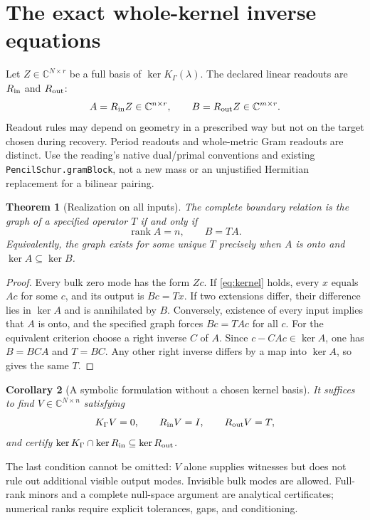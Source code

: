 \documentclass[11pt]{article}
\newtheorem{theorem}{Theorem}[section]
\newtheorem{corollary}[theorem]{Corollary}
\theoremstyle{definition}
\newcommand{\C}{\mathbb C}
\newcommand{\rank}{\operatorname{rank}}
\begin{document}
\section{The exact whole-kernel inverse equations}\label{sec:kernel}
Let $Z\in\C^{N\times r}$ be a full basis of $\ker K_\Gamma(\lambda)$.
The declared linear readouts are $R_{\rm in}$ and $R_{\rm out}$:
\[
 A=R_{\rm in}Z\in\C^{n\times r},\qquad
 B=R_{\rm out}Z\in\C^{m\times r}.
\]
Readout rules may depend on geometry in a prescribed way but not on the
target chosen during recovery. Period readouts and whole-metric Gram
readouts are distinct. Use the reading's native dual/primal conventions
and existing \texttt{PencilSchur.gramBlock}, not a new mass or an
unjustified Hermitian replacement for a bilinear pairing.

\begin{theorem}[Realization on all inputs]\label{thm:kernel}
The complete boundary relation is the graph of a specified operator $T$
if and only if
\begin{equation}\label{eq:kernel}
 \rank A=n,\qquad B=TA.
\end{equation}
Equivalently, the graph exists for some unique $T$ precisely when
$A$ is onto and $\ker A\subseteq\ker B$.
\end{theorem}
\begin{proof}
Every bulk zero mode has the form $Zc$. If \eqref{eq:kernel} holds,
every $x$ equals $Ac$ for some $c$, and its output is $Bc=Tx$.
If two extensions differ, their difference lies in $\ker A$ and is
annihilated by $B$. Conversely, existence of every input implies that
$A$ is onto, and the specified graph forces $Bc=TAc$ for all $c$.
For the equivalent criterion choose a right inverse $C$ of $A$.
Since $c-CAc\in\ker A$, one has $B=BCA$ and $T=BC$.
Any other right inverse differs by a map into $\ker A$, so gives
the same $T$.
\end{proof}

\begin{corollary}[A symbolic formulation without a chosen kernel basis]
It suffices to find $V\in\C^{N\times n}$ satisfying
\[
 K_\Gamma V=0,\qquad R_{\rm in}V=I,\qquad R_{\rm out}V=T,
\]
\emph{and} certify
$\ker K_\Gamma\cap\ker R_{\rm in}\subseteq\ker R_{\rm out}$.
\end{corollary}
The last condition cannot be omitted: $V$ alone supplies witnesses but
does not rule out additional visible output modes. Invisible bulk modes
are allowed. Full-rank minors and a complete null-space argument are
analytical certificates; numerical ranks require explicit tolerances,
gaps, and conditioning.
\end{document}

